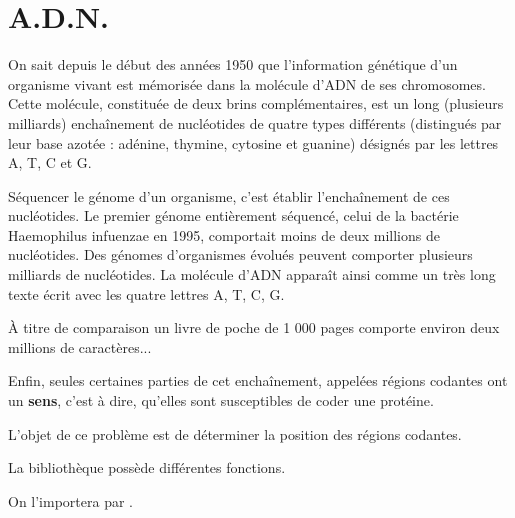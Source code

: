 \chapter{A.D.N.}
\thispagestyle{empty}
\vskip -1cm

{\sf On sait depuis le début des années 1950 que l'information génétique d'un organisme
vivant est mémorisée dans la molécule d'ADN de ses chromosomes. Cette molécule,
constituée de deux brins complémentaires, est un long (plusieurs milliards) enchaînement de nucléotides de
quatre types différents (distingués par leur base azotée : adénine, thymine, cytosine et
guanine) désignés par les lettres A, T, C et G.


Séquencer le génome d'un organisme, c'est établir l'enchaînement de ces nucléotides.
Le premier génome entièrement séquencé, celui de la bactérie {\sc Haemophilus infuenzae} en 1995, comportait moins de deux millions de nucléotides. 
Des génomes d'organismes évolués peuvent comporter plusieurs milliards de nucléotides.
La molécule d'ADN apparaît ainsi comme un très long texte écrit avec les quatre lettres
A, T, C, G.

À titre de comparaison un livre de poche de 1 000 pages comporte environ deux millions de caractères...

Enfin, seules certaines parties de cet enchaînement, appelées régions codantes ont
un {\bf sens}, c'est à dire, qu'elles sont susceptibles de coder une protéine.

L'objet de ce problème est de déterminer la position des régions codantes.
}

\medskip

La bibliothèque  possède différentes fonctions.

On l'importera par .

